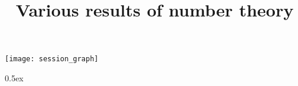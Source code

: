 \documentclass[11pt,a4paper]{article}
\begin{document}
\title{Various results of number theory}
\maketitle

\tableofcontents

\begin{center}
  \texttt{[image: session\_graph]}
\end{center}

\newpage

\parindent 0pt\parskip 0.5ex


\end{document}
